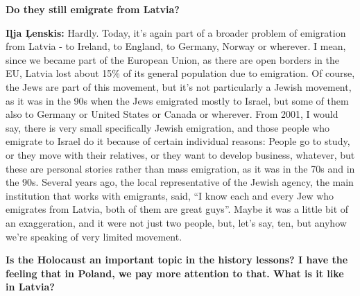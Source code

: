 \textbf{Do they still emigrate from Latvia?} 

\textbf{Iļja Ļenskis:} Hardly. Today, it’s again part of a broader problem of emigration from Latvia - to Ireland, to England, to Germany, Norway or wherever. I mean, since we became part of the European Union, as there are open borders in the EU, Latvia lost about 15\% of its general population due to emigration. Of course, the Jews are part of this movement, but it’s not particularly a Jewish movement, as it was in the 90s when the Jews emigrated mostly to Israel, but some of them also to Germany or United States or Canada or wherever. From 2001, I would say, there is very small specifically Jewish emigration, and those people who emigrate to Israel do it because of certain individual reasons: People go to study, or they move with their relatives, or they want to develop business, whatever, but these are personal stories rather than mass emigration, as it was in the 70s and in the 90s. Several years ago, the local representative of the Jewish agency, the main institution that works with emigrants, said, ``I know each and every Jew who emigrates from Latvia, both of them are great guys''. Maybe it was a little bit of an exaggeration, and it were not just two people, but, let’s say, ten, but anyhow we’re speaking of very limited movement. 

\textbf{Is the Holocaust an important topic in the history lessons? I have the feeling that in Poland, we pay more attention to that. What is it like in Latvia?} 

